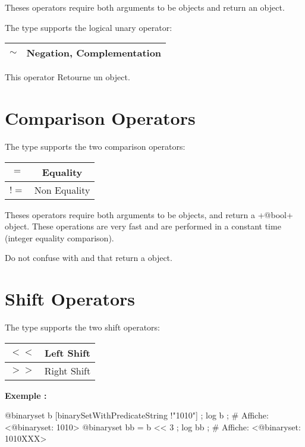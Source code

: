 Theses operators require both arguments to be  objects and return an  object.\newline


The  type supports the logical unary operator:\newline

\begin{tabular}{|c|c|}
\hline
$\sim$ & Negation, Complementation \\
\hline
\end{tabular}

This operator Retourne un  object.







\section{Comparison Operators}

The  type supports the two comparison operators:\newline

\begin{tabular}{|c|c|}
\hline
$=$ & Equality \\
\hline
$!=$ & Non Equality \\
\hline
\end{tabular}

Theses operators require both arguments to be  objects, and return a \ggs+@bool+ object. These operations are very fast and are performed in a constant time (integer equality comparison).

Do not confuse with  and  that return a  object.







\section{Shift Operators}

The  type supports the two shift operators:\newline

\begin{tabular}{|c|c|}
\hline
$<<$ & Left Shift \\
\hline
$>>$ & Right Shift \\
\hline
\end{tabular}

\textbf{Exemple :}
\begin{galgascode}
@binaryset b [binarySetWithPredicateString !"1010"] ;
log b ; # Affiche: <@binaryset: 1010>
@binaryset bb = b << 3 ;
log bb ; # Affiche: <@binaryset: 1010XXX>
\end{galgascode}

